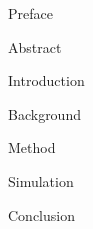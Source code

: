 \documentclass{article}
\begin{document}
\frontmatter
{}
{Preface}

{Abstract}

\newpage

\singlespacing
\tableofcontents
\doublespacing


\newpage
\listoffigures
\newpage
\printnoidxglossaries

\mainmatter

{Introduction}

{Background}

{Method}

{Simulation}

{Conclusion}




\newpage
\printbibliography[heading = bibintoc, title = References]    %


\end{document}
